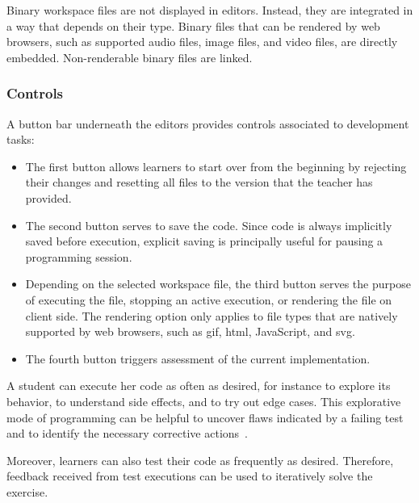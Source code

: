 Binary workspace files are not displayed in editors. Instead, they are integrated in a way that depends on their type. Binary files that can be rendered by web browsers, such as supported audio files, image files, and video files, are directly embedded. Non-renderable binary files are linked.

\subsubsection{Controls}

A button bar underneath the editors provides controls associated to development tasks:

\begin{itemize}
\item
  The first button allows learners to start over from the beginning by rejecting their changes and resetting all files to the version that the teacher has provided.
\item
  The second button serves to save the code. Since code is always implicitly saved before execution, explicit saving is principally useful for pausing a programming session.
\item
  Depending on the selected workspace file, the third button serves the purpose of executing the file, stopping an active execution, or rendering the file on client side. The rendering option only applies to file types that are natively supported by web browsers, such as \gls{gif}, \gls{html}, JavaScript, and \gls{svg}.
\item
  The fourth button triggers assessment of the current implementation.
\end{itemize}

A student can execute her code as often as desired, for instance to explore its behavior, to understand side effects, and to try out edge cases. This explorative mode of programming can be helpful to uncover flaws indicated by a failing test and to identify the necessary corrective actions~\cite{vihavainen2012multi}.

Moreover, learners can also test their code as frequently as desired. Therefore, feedback received from test executions can be used to iteratively solve the exercise.
